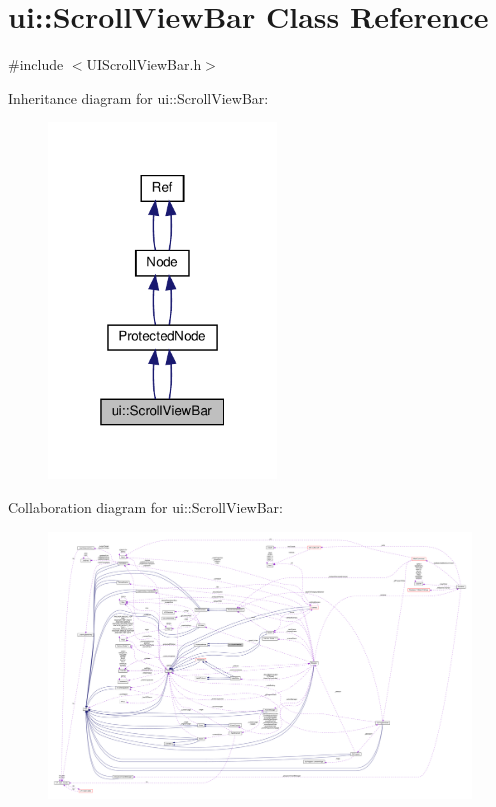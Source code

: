 \hypertarget{classui_1_1ScrollViewBar}{}\section{ui\+:\+:Scroll\+View\+Bar Class Reference}
\label{classui_1_1ScrollViewBar}


{\ttfamily \#include $<$U\+I\+Scroll\+View\+Bar.\+h$>$}



Inheritance diagram for ui\+:\+:Scroll\+View\+Bar\+:
\nopagebreak
\begin{figure}[H]
\begin{center}
\leavevmode
\includegraphics[width=172pt]{classui_1_1ScrollViewBar__inherit__graph}
\end{center}
\end{figure}


Collaboration diagram for ui\+:\+:Scroll\+View\+Bar\+:
\nopagebreak
\begin{figure}[H]
\begin{center}
\leavevmode
\includegraphics[width=350pt]{classui_1_1ScrollViewBar__coll__graph}
\end{center}
\end{figure}

